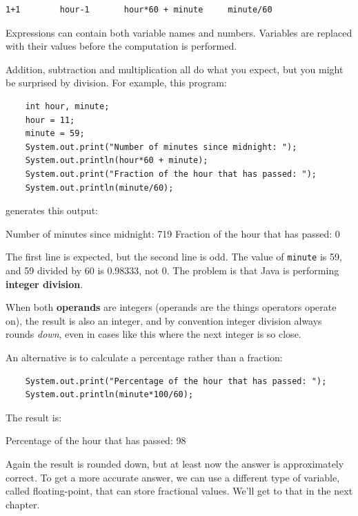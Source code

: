 \begin{lstlisting}
1+1        hour-1       hour*60 + minute     minute/60
\end{lstlisting}
%
Expressions can contain both variable
names and numbers.  Variables are
replaced with their values before the computation is performed.


Addition, subtraction and multiplication all do what you
expect, but you might be surprised by division.  For example,
this program:

\begin{lstlisting}
    int hour, minute;
    hour = 11;
    minute = 59;
    System.out.print("Number of minutes since midnight: ");
    System.out.println(hour*60 + minute);
    System.out.print("Fraction of the hour that has passed: ");
    System.out.println(minute/60);
\end{lstlisting}
%
generates this output:

\begin{verbatimtab}
Number of minutes since midnight: 719
Fraction of the hour that has passed: 0
\end{verbatimtab}
%
The first line is expected, but the second line is
odd.  The value of {\tt minute} is 59, and
59 divided by 60 is 0.98333, not 0.  The problem is that
Java is performing {\bf integer division}.


When both {\bf operands} are integers (operands are the things
operators operate on), the result is also an integer,
and by convention integer division always rounds {\em down},
even in cases like this where the next integer is so close.

An alternative is to calculate a percentage
rather than a fraction:

\begin{lstlisting}
    System.out.print("Percentage of the hour that has passed: ");
    System.out.println(minute*100/60);
\end{lstlisting}
%
The result is:

\begin{verbatimtab}
Percentage of the hour that has passed: 98
\end{verbatimtab}
%
Again the result is rounded down, but at least now the answer
is approximately correct.  To get a more accurate
answer, we can use a different type of variable, called
floating-point, that can store fractional values.
We'll get to that in the next chapter.


